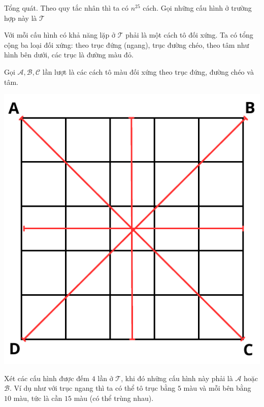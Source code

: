 \documentclass[11pt]{scrartcl}
\begin{document}
\begin{itemize}[label=, leftmargin=0em, itemsep=-0em]
\begin{sol}
             Tổng quát. Theo quy tắc nhân thì ta có $n^{25}$ cách. Gọi những cấu hình ở trường hợp này là $\mathcal{T}$

            Với mỗi cấu hình có khả năng lặp ở $\mathcal{T}$ phải là một cách tô đối xứng. Ta có tổng cộng ba loại đối xứng: theo trục đứng (ngang), trục đường chéo, theo tâm như hình bên dưới, các trục là đường màu đỏ.

           
            Gọi $\mathcal{A},\mathcal{B},\mathcal{C}$ lần lượt là các cách tô màu đối xứng theo trục đứng, đường chéo và tâm.
            \begin{center}
                \includegraphics[scale=0.57]{ex1.pdf}
            \end{center}
            Xét các cấu hình được đếm $4$ lần ở $\mathcal{T}$, khi đó những cấu hình này phải là $\mathcal{A}$ hoặc $\mathcal{B}$. Ví dụ như với trục ngang thì ta có thể tô trục bằng $5$ màu và mỗi bên bằng $10$ màu, tức là cần $15$ màu (có thể trùng nhau).
            \begin{center}

\end{center}
\end{sol}
\end{itemize}
\end{document}
